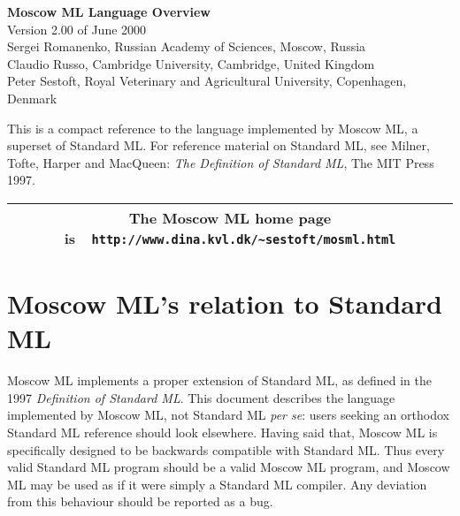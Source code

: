 \documentclass[fleqn]{article}
\begin{document}
\begin{center}

  \vspace*{0cm}

{\huge\bf Moscow ML Language Overview}\\[0.5cm]

{Version 2.00 of June 2000}\\[1cm]

Sergei Romanenko, Russian Academy of Sciences, Moscow, Russia\\
Claudio Russo, Cambridge University, Cambridge, United Kingdom\\
Peter Sestoft, Royal Veterinary and Agricultural University, 
Copenhagen, Denmark
\end{center}

\noindent This is a compact reference to the language implemented by
Moscow ML, a superset of Standard ML\@.  For reference material on
Standard ML, see Milner, Tofte, Harper and MacQueen: {\em The
  Definition of Standard ML\/}, The MIT Press 1997. 



\tableofcontents

\vfill

\begin{center}
\begin{tabular}{|c|}\hline
\rule[-0.4cm]{0cm}{1cm}The Moscow ML home page is\ \
    \verb$http://www.dina.kvl.dk/~sestoft/mosml.html$\\\hline
\end{tabular}
\end{center}

\newpage 

\section{Moscow ML's relation to Standard ML}\label{sec-SMLcompliance}

Moscow ML implements a proper extension of Standard ML, 
as  defined in the 1997 {\em Definition of Standard ML\/}.
This document describes the language implemented by Moscow ML, not Standard ML 
\emph{per se}: users seeking an orthodox Standard ML reference should look elsewhere.
Having said that, Moscow ML is specifically designed to be backwards compatible with Standard ML. Thus every valid Standard ML program should be a valid
Moscow ML program, and Moscow ML may be used as if it were simply
a Standard ML compiler. Any deviation from this behaviour should be reported
as a bug.
\end{document}
